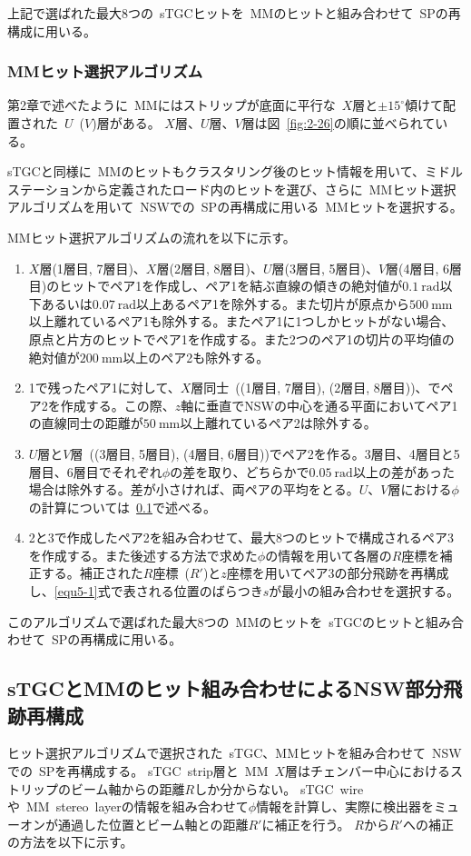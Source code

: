 上記で選ばれた最大8つの~sTGCヒットを~MMのヒットと組み合わせて~SPの再構成に用いる。

\subsubsection{MMヒット選択アルゴリズム}
第2章で述べたように~MMにはストリップが底面に平行な~$X$層と$\pm15^\circ$傾けて配置された~$U$~($V$)層がある。
$X$層、$U$層、$V$層は図~\ref{fig:2-26}の順に並べられている。

sTGCと同様に~MMのヒットもクラスタリング後のヒット情報を用いて、ミドルステーションから定義されたロード内のヒットを選び、さらに~MMヒット選択アルゴリズムを用いて~NSWでの~SPの再構成に用いる~MMヒットを選択する。

MMヒット選択アルゴリズムの流れを以下に示す。
\begin{enumerate}
    \item $X$層(1層目, 7層目)、$X$層(2層目, 8層目)、$U$層(3層目, 5層目)、$V$層(4層目, 6層目)のヒットでペア1を作成し、ペア1を結ぶ直線の傾きの絶対値が$\SI{0.1}{\radian}$以下あるいは$\SI{0.07}{\radian}$以上あるペア1を除外する。また切片が原点から$\SI{500}{\mm}$以上離れているペア1も除外する。またペア1に1つしかヒットがない場合、原点と片方のヒットでペア1を作成する。また2つのペア1の切片の平均値の絶対値が$\SI{200}{\mm}$以上のペア2も除外する。
    \item 1で残ったペア1に対して、$X$層同士~((1層目, 7層目), (2層目, 8層目))、でペア2を作成する。この際、$z$軸に垂直でNSWの中心を通る平面においてペア1の直線同士の距離が$\SI{50}{\mm}$以上離れているペア2は除外する。
    \item $U$層と$V$層~((3層目, 5層目), (4層目, 6層目))でペア2を作る。3層目、4層目と5層目、6層目でそれぞれ$\phi$の差を取り、どちらかで$\SI{0.05}{\radian}$以上の差があった場合は除外する。差が小さければ、両ペアの平均をとる。$U$、$V$層における$\phi$の計算については~\ref{chapter5-1-2}で述べる。
    \item 2と3で作成したペア2を組み合わせて、最大8つのヒットで構成されるペア3を作成する。また後述する方法で求めた$\phi$の情報を用いて各層の$R$座標を補正する。補正された$R$座標~($R'$)と$z$座標を用いてペア3の部分飛跡を再構成し、\eqref{equ5-1}式で表される位置のばらつき$s$が最小の組み合わせを選択する。
\end{enumerate}

このアルゴリズムで選ばれた最大8つの~MMのヒットを~sTGCのヒットと組み合わせて~SPの再構成に用いる。


\subsection{sTGCとMMのヒット組み合わせによるNSW部分飛跡再構成}\label{chapter5-1-2}
ヒット選択アルゴリズムで選択された~sTGC、MMヒットを組み合わせて~NSWでの~SPを再構成する。
sTGC~strip層と~MM~$X$層はチェンバー中心におけるストリップのビーム軸からの距離$R$しか分からない。
sTGC~wireや~MM~stereo~layerの情報を組み合わせて$\phi$情報を計算し、実際に検出器をミューオンが通過した位置とビーム軸との距離$R'$に補正を行う。
$R$から$R'$への補正の方法を以下に示す。

